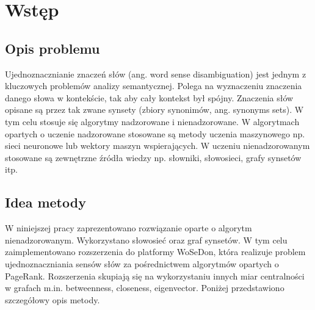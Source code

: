 \chapter{Wstęp}
\section{Opis problemu}
Ujednoznacznianie znaczeń słów (ang. word sense disambiguation) jest jednym z kluczowych problemów analizy semantycznej. Polega na wyznaczeniu znaczenia danego słowa w kontekście, tak aby cały kontekst był spójny. Znaczenia słów opisane są przez tak zwane synsety (zbiory synonimów, ang. synonyms sets). W tym celu stosuje się algorytmy nadzorowane i nienadzorowane. W algorytmach opartych o uczenie nadzorowane stosowane są metody uczenia maszynowego np. sieci neuronowe lub wektory maszyn wspierających. W uczeniu nienadzorowanym stosowane są zewnętrzne źródła wiedzy np. słowniki, słowosieci, grafy synsetów itp. 
\section{Idea metody}
W niniejszej pracy zaprezentowano rozwiązanie oparte o algorytm nienadzorowanym. Wykorzystano słowosieć oraz graf synsetów. W tym celu zaimplementowano rozszerzenia do platformy WoSeDon, która realizuje problem ujednoznaczniania sensów słów za pośrednictwem algorytmów opartych o PageRank. Rozszerzenia skupiają się na wykorzystaniu innych miar centralności w grafach m.in. betweenness, closeness, eigenvector. Poniżej przedstawiono szczegółowy opis metody.